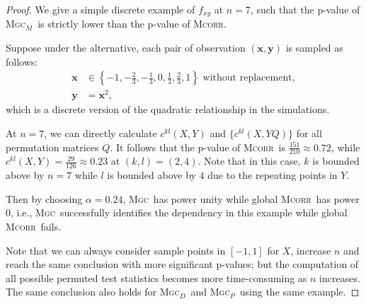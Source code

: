 \documentclass[11pt]{article}
\providecommand{\sct}[1]{{\normalfont\textsc{#1}}}
\providecommand{\mb}[1]{\boldsymbol{#1}}
\newcommand{\G}{c}
\newcommand{\Mgc}{\sct{Mgc}}
\newcommand{\Mgcp}{\sct{Mgc$_P$}}
\newcommand{\Mgcd}{\sct{Mgc$_D$}}
\newcommand{\Mgcm}{\sct{Mgc$_M$}}
\newcommand{\Mcorr}{\sct{Mcorr}}
\begin{document}
\begin{proof}
We give a simple discrete example of $f_{xy}$ at $n=7$, such that the p-value of \Mgcm~is strictly lower than the p-value of \Mcorr.

Suppose under the alternative, each pair of observation $(\mb{x},\mb{y})$ is sampled as follows:
\begin{align*}
\mb{x} &\in \left\{-1,-\frac{2}{3},-\frac{1}{3},0,\frac{1}{3},\frac{2}{3},1\right\} \mbox{ without replacement}, \\
\mb{y} &= \mb{x}^2,
\end{align*}
which is a discrete version of the quadratic relationship in the simulations.

At $n=7$, we can directly calculate $\G^{kl}(X, Y)$ and $\{\G^{kl}(X, YQ)\}$ for all permutation matrices $Q$. It follows that the p-value of \Mcorr~is $\frac{151}{210} \approx 0.72$, while $\G^{kl}(X, Y)=\frac{29}{126} \approx 0.23$ at $(k,l)=(2,4)$. Note that in this case, $k$ is bounded above by $n=7$ while $l$ is bounded above by $4$ due to the repeating points in $Y$. 

Then by choosing $\alpha=0.24$, \Mgc~has power unity while global \Mcorr~has power $0$, i.e., \Mgc~successfully identifies the dependency in this example while global \Mcorr~fails.

Note that we can always consider sample points in $[-1,1]$ for $X$, increase $n$ and reach the same conclusion with more significant p-values; but the computation of all possible permuted test statistics becomes more time-consuming as $n$ increases. The same conclusion also holds for \Mgcd~and \Mgcp~using the same example.
\end{proof}
\end{document}
